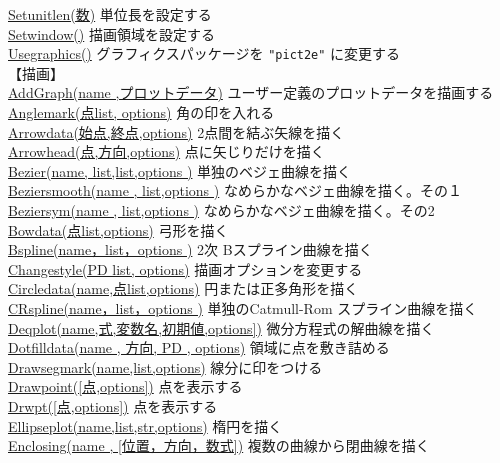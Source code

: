 \documentclass[papersize,a4paper,12pt,uplatex]{jsarticle}
\begin{document}
\begin{tabbing}
\hyperlink{setunitlen}{Setunitlen(数)}    \>単位長を設定する\\
\hyperlink{setwindow}{Setwindow()}  \>描画領域を設定する\\
\hyperlink{usegraphics}{Usegraphics()} \>グラフィクスパッケージを  \verb|"pict2e"| に変更する\\
【描画】\\
\hyperlink{addgraph}{AddGraph(name ,プロットデータ)} \>ユーザー定義のプロットデータを描画する\\
\hyperlink{anglemark}{Anglemark(点list, options)}  \>角の印を入れる\\
\hyperlink{arrowdata}{Arrowdata(始点,終点,options)}  \>2点間を結ぶ矢線を描く\\
\hyperlink{arrowhead}{Arrowhead(点,方向,options)}  \>点に矢じりだけを描く\\
\hyperlink{bezier}{Bezier(name, list,list,options )} \>単独のベジェ曲線を描く\\
\hyperlink{beziersmooth}{Beziersmooth(name , list,options )} \>なめらかなベジェ曲線を描く。その１\\
\hyperlink{beziersym}{Beziersym(name , list,options )} \>なめらかなベジェ曲線を描く。その2\\
\hyperlink{bowdata}{Bowdata(点list,options)}  \>弓形を描く\\
\hyperlink{bspline}{Bspline(name，list，options )}   \>2次 Bスプライン曲線を描く\\
\hyperlink{changestyle}{Changestyle(PD list, options)} \>描画オプションを変更する\\
\hyperlink{circledata}{Circledata(name,点list,options)}  \>円または正多角形を描く\\
\hyperlink{crspline}{CRspline(name，list，options )} \>単独のCatmull-Rom スプライン曲線を描く\\
\hyperlink{deqplot}{Deqplot(name,式,変数名,初期値,options])}  \>微分方程式の解曲線を描く\\
\hyperlink{dotfilldata}{Dotfilldata(name , 方向, PD , options)}    \>領域に点を敷き詰める\\
\hyperlink{drawsegmark}{Drawsegmark(name,list,options)}  \>線分に印をつける\\
\hyperlink{drwpt}{Drawpoint([点,options])}  \>点を表示する\\
\hyperlink{drwpt}{Drwpt([点,options])}      \>点を表示する\\
\hyperlink{ellipseplot}{Ellipseplot(name,list,str,options)}  \>楕円を描く\\
\hyperlink{enclosing}{Enclosing(name , [位置，方向，数式])}  \>複数の曲線から閉曲線を描く\\

\end{tabbing}
\end{document}
